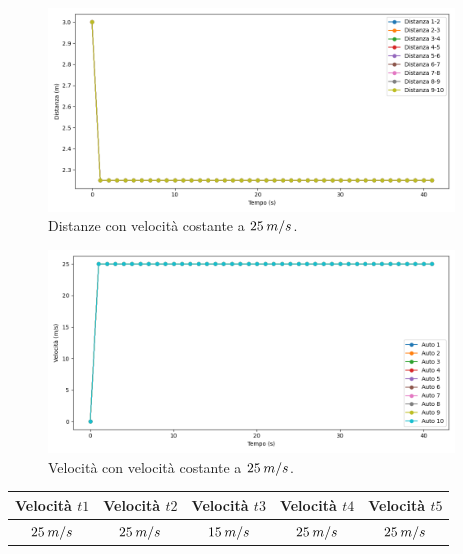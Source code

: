 \begin{figure}[H]
    \includegraphics[width=0.96\textwidth]{images/5-experiment/compost/distance_b.png}
    \caption{Distanze con velocità costante a $25\hspace{0.2em}m/s$.}
    \label{fig:b-compost-distance}
\end{figure}

\begin{figure}[H]
    \includegraphics[width=0.96\textwidth]{images/5-experiment/compost/velocity_b.png}
    \caption{Velocità con velocità costante a $25\hspace{0.2em}m/s$.}
    \label{fig:b-compost-velocity}
\end{figure}
\vspace*{\fill}
\newpage

\begin{table}[h]
    \centering
    \begin{tabular}{|c|c|c|c|c|}
        \hline
        Velocità $t1$ & Velocità $t2$ & Velocità $t3$ &Velocità $t4$ &Velocità $t5$\\
        \hline
            $25\hspace{0.2em}m/s$ & $25\hspace{0.2em}m/s$ & $15\hspace{0.2em}m/s$ & $25\hspace{0.2em}m/s$ & $25\hspace{0.2em}m/s$ \\
        \hline
    \end{tabular}
\end{table}

